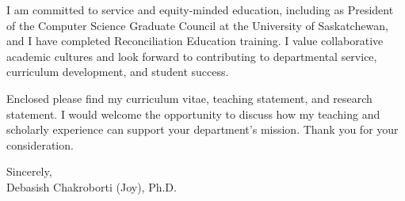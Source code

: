 \documentclass[10pt]{letter}
\begin{document}
I am committed to service and equity-minded education, including as President of the Computer Science Graduate Council at the University of Saskatchewan, and I have completed Reconciliation Education training. I value collaborative academic cultures and look forward to contributing to departmental service, curriculum development, and student success.

Enclosed please find my curriculum vitae, teaching statement, and research statement. I would welcome the opportunity to discuss how my teaching and scholarly experience can support your department's mission. Thank you for your consideration.

\vspace{0.7em}
\noindent Sincerely,\\[0.9em]
Debasish Chakroborti (Joy), Ph.D.
\end{document}
